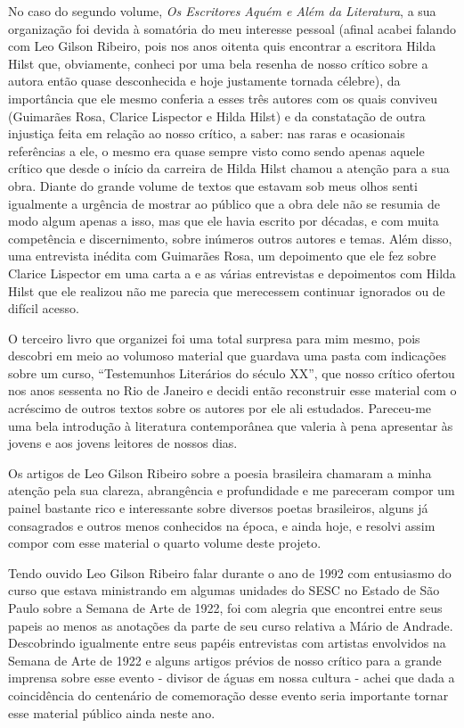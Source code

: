 \documentclass[
  a4paper,
  oneside]{scrbook}
\begin{document}
No caso do segundo volume, \emph{Os Escritores Aquém e Além da
Literatura}, a sua organização foi devida à somatória do meu interesse
pessoal (afinal acabei falando com Leo Gilson Ribeiro, pois nos anos
oitenta quis encontrar a escritora Hilda Hilst que, obviamente, conheci
por uma bela resenha de nosso crítico sobre a autora então quase
desconhecida e hoje justamente tornada célebre), da importância que ele
mesmo conferia a esses três autores com os quais conviveu (Guimarães
Rosa, Clarice Lispector e Hilda Hilst) e da constatação de outra
injustiça feita em relação ao nosso crítico, a saber: nas raras e
ocasionais referências a ele, o mesmo era quase sempre visto como sendo
apenas aquele crítico que desde o início da carreira de Hilda Hilst
chamou a atenção para a sua obra. Diante do grande volume de textos que
estavam sob meus olhos senti igualmente a urgência de mostrar ao público
que a obra dele não se resumia de modo algum apenas a isso, mas que ele
havia escrito por décadas, e com muita competência e discernimento,
sobre inúmeros outros autores e temas. Além disso, uma entrevista
inédita com Guimarães Rosa, um depoimento que ele fez sobre Clarice
Lispector em uma carta a e as várias entrevistas e depoimentos com Hilda
Hilst que ele realizou não me parecia que merecessem continuar ignorados
ou de difícil acesso.

O terceiro livro que organizei foi uma total surpresa para mim mesmo,
pois descobri em meio ao volumoso material que guardava uma pasta com
indicações sobre um curso, ``Testemunhos Literários do século XX'', que
nosso crítico ofertou nos anos sessenta no Rio de Janeiro e decidi então
reconstruir esse material com o acréscimo de outros textos sobre os
autores por ele ali estudados. Pareceu-me uma bela introdução à
literatura contemporânea que valeria à pena apresentar às jovens e aos
jovens leitores de nossos dias.

Os artigos de Leo Gilson Ribeiro sobre a poesia brasileira chamaram a
minha atenção pela sua clareza, abrangência e profundidade e me
pareceram compor um painel bastante rico e interessante sobre diversos
poetas brasileiros, alguns já consagrados e outros menos conhecidos na
época, e ainda hoje, e resolvi assim compor com esse material o quarto
volume deste projeto.

Tendo ouvido Leo Gilson Ribeiro falar durante o ano de 1992 com
entusiasmo do curso que estava ministrando em algumas unidades do SESC
no Estado de São Paulo sobre a Semana de Arte de 1922, foi com alegria
que encontrei entre seus papeis ao menos as anotações da parte de seu
curso relativa a Mário de Andrade. Descobrindo igualmente entre seus
papéis entrevistas com artistas envolvidos na Semana de Arte de 1922 e
alguns artigos prévios de nosso crítico para a grande imprensa sobre
esse evento - divisor de águas em nossa cultura - achei que dada a
coincidência do centenário de comemoração desse evento seria importante
tornar esse material público ainda neste ano.
\end{document}
